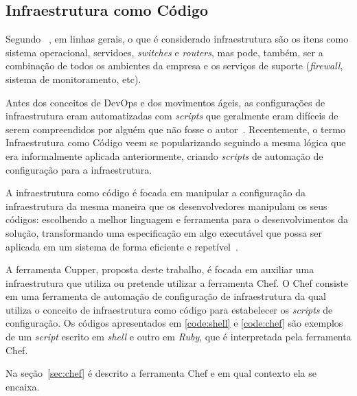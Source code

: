 \subsection{Infraestrutura como Código}


Segundo ~, em linhas gerais, o que é considerado
infraestrutura são os itens como sistema operacional, servidoes,
\textit{switches} e \textit{routers}, mas pode, também, ser a combinação
de todos os ambientes da empresa e os serviços de suporte (\textit{firewall},
sistema de monitoramento, etc).

Antes dos conceitos de DevOps e dos movimentos ágeis, as configurações de
infraestrutura eram automatizadas com \textit{scripts} que geralmente eram
difíceis de serem compreendidos por alguém que não fosse o autor~\cite{huttermann:2012}.
Recentemente, o termo Infraestrutura como Código veem se popularizando
seguindo a mesma lógica que era informalmente aplicada anteriormente, criando
\textit{scripts} de automação de configuração para a infraestrutura.

A infraestrutura como código é focada em manipular a configuração da infraestrutura
da mesma maneira que os desenvolvedores manipulam os seus códigos: escolhendo a melhor
linguagem e ferramenta para o desenvolvimentos da solução, transformando uma especificação
em algo executável que possa ser aplicada em um sistema de forma eficiente e
repetível~\cite{huttermann:2012}. \\

\noindent\begin{minipage}{.45\textwidth}
  \lstset{style=shell}
  
\end{minipage}\hfill
\begin{minipage}{.45\textwidth}
  \lstset{style=shell}
  
\end{minipage}


A ferramenta Cupper, proposta deste trabalho, é focada em auxiliar uma infraestrutura que
utiliza ou pretende utilizar a ferramenta Chef. O Chef consiste em uma ferramenta de
automação de configuração de infraestrutura da qual utiliza o conceito de infraestrutura
como código para estabelecer os \textit{scripts} de configuração. Os códigos apresentados em \ref{code:shell} e
\ref{code:chef} são exemplos de um \textit{script} escrito em \textit{shell} e outro em \textit{Ruby}, que é
interpretada pela ferramenta Chef.

Na seção~\ref{sec:chef} é descrito a ferramenta Chef e em qual contexto
ela se encaixa.
